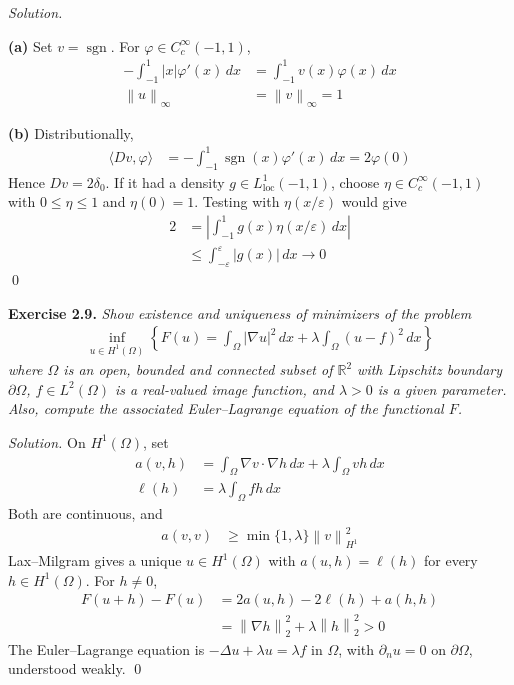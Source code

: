\documentclass[12pt,letterpaper]{article}
\newcommand{\R}{\mathbb R}
\newcommand{\dx}{\,dx}
\newcommand{\eps}{\varepsilon}
\newcommand{\norm}[1]{\left\lVert #1\right\rVert}
\newcommand{\exercise}[1]{%
  \par\bigskip\noindent\textbf{Exercise #1.}\enspace}
\newenvironment{statement}{\itshape\ignorespaces}{\par}
\newcommand{\solution}{\par\medskip\noindent\textit{Solution.}\enspace}
\newcommand{\partlabel}[1]{\par\medskip\noindent\textbf{(#1)}\enspace}
\newcommand{\finish}{\qed\par}
\begin{document}
\solution
\partlabel{a} Set $v=\operatorname{sgn}$. For $\varphi\in C_c^\infty(-1,1)$,
\begin{align*}
 -\int_{-1}^1|x|\varphi'(x)\,dx
 &=\int_{-1}^1v(x)\varphi(x)\,dx\\
 \norm{u}_\infty&=\norm{v}_\infty=1
\end{align*}

\partlabel{b} Distributionally,
\begin{align*}
 \langle Dv,\varphi\rangle
 &=-\int_{-1}^1\operatorname{sgn}(x)\varphi'(x)\,dx
 =2\varphi(0)
\end{align*}
Hence $Dv=2\delta_0$. If it had a density $g\in L^1_{\mathrm{loc}}(-1,1)$,
choose $\eta\in C_c^\infty(-1,1)$ with $0\le\eta\le1$ and $\eta(0)=1$.
Testing with $\eta(x/\eps)$ would give
\begin{align*}
 2&=\left|\int_{-1}^1g(x)\eta(x/\eps)\,dx\right|\\
 &\le\int_{-\eps}^{\eps}|g(x)|\,dx\longrightarrow0
\end{align*}
\finish

\begin{samepage}
\exercise{2.9}
\begin{statement}
Show existence and uniqueness of minimizers of the problem
\begin{align*}
 \inf_{u\in H^1(\Omega)}
 \left\{F(u)=\int_\Omega|\nabla u|^2\dx
                  +\lambda\int_\Omega(u-f)^2\dx\right\}
\end{align*}
where $\Omega$ is an open, bounded and connected subset of $\R^2$
with Lipschitz boundary $\partial\Omega$, $f\in L^2(\Omega)$ is a
real-valued image function, and $\lambda>0$ is a given parameter.
Also, compute the associated Euler--Lagrange equation of the functional $F$.
\end{statement}
\end{samepage}

\solution
On $H^1(\Omega)$, set
\begin{align*}
 a(v,h)&=\int_\Omega\nabla v\cdot\nabla h\dx
                         +\lambda\int_\Omega vh\dx\\
 \ell(h)&=\lambda\int_\Omega fh\dx
\end{align*}
Both are continuous, and
\begin{align*}
 a(v,v)&\ge\min\{1,\lambda\}\norm v_{H^1}^2
\end{align*}
Lax--Milgram gives a unique $u\in H^1(\Omega)$ with $a(u,h)=\ell(h)$
for every $h\in H^1(\Omega)$. For $h\ne0$,
\begin{align*}
 F(u+h)-F(u)&=2a(u,h)-2\ell(h)+a(h,h)\\
 &=\norm{\nabla h}_2^2+\lambda\norm h_2^2>0
\end{align*}
The Euler--Lagrange equation is $-\Delta u+\lambda u=\lambda f$ in
$\Omega$, with $\partial_nu=0$ on $\partial\Omega$, understood weakly.
\finish
\end{document}
